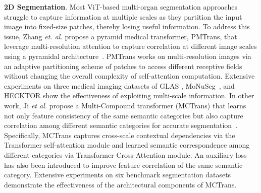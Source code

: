 \documentclass[10pt,journal,compsoc]{IEEEtran}
\begin{document}
{{\textbf{2D Segmentation}.}}
Most ViT-based multi-organ segmentation approaches struggle to capture information at multiple scales as they partition the input image into fixed-size patches, thereby losing useful information. To address this issue, Zhang \textit{et. al.} \cite{zhang2021pyramid} propose a pyramid medical transformer, PMTrans, that leverage multi-resolution attention to capture correlation at different image scales using a pyramidal architecture~\cite{ghiasi2016laplacian}. PMTrans works on multi-resolution images via an adaptive partitioning scheme of patches to access different receptive fields without changing the overall complexity of self-attention computation. Extensive experiments on three medical imaging datasets of GLAS \cite{sirinukunwattana2017gland}, MoNuSeg~\cite{kumar2017dataset}, and HECKTOR \cite{andrearczyk2020overview} show the effectiveness of exploiting multi-scale information.%
In other work, Ji \textit{et al.} \cite{ji2021multi} propose a Multi-Compound transformer (MCTrans) that learns not only feature consistency of the same semantic categories but also capture correlation among different semantic categories for accurate segmentation~\cite{yu2020context}. Specifically, MCTrans captures cross-scale contextual dependencies via the Transformer self-attention module and learned semantic correspondence among different categories via Transformer Cross-Attention module. An auxiliary loss has also been introduced to improve feature correlation of the same semantic category. Extensive experiments on six benchmark segmentation datasets demonstrate the effectiveness of the architectural components of MCTrans.%
\end{document}
